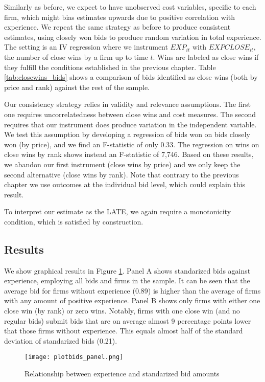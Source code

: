 Similarly as before, we expect to have unobserved cost variables, specific to each firm, which might bias estimates upwards due to positive correlation with experience. We repeat the same strategy as before to produce consistent estimates, using closely won bids to produce random variation in total experience. The setting is an IV regression where we instrument $EXP_{it}$ with $EXPCLOSE_{it}$, the number of close wins by a firm up to time $t$. Wins are labeled as close wins if they fulfill the conditions established in the  previous chapter. Table \ref{tab:closewins_bids} shows a comparison of bids identified as close wins (both by price and rank) against the rest of the sample.

Our consistency strategy relies in validity and relevance assumptions. The first one requires uncorrelatedness between close wins and cost measures. The second requires that our instrument does produce variation in the independent variable. We test this assumption by developing a regression of bids won on bids closely won (by price), and we find  an F-statistic of only 0.33. The regression on wins on close wins by rank shows instead an F-statistic of 7,746. Based on these results, we abandon our first instrument (close wins by price) and we only keep the second alternative (close wins by rank). Note that contrary to the previous chapter we use outcomes at the individual bid level, which could explain this result.

To interpret our estimate as the LATE, we again require a monotonicity condition, which is satisfied by construction.



\subsection{Results}
We show graphical results in Figure \ref{fig:plotbids_panel}. Panel A shows standarized bids against experience, employing all bids and firms in the sample. It can be seen that the average bid for firms without experience (0.89) is higher than the average of firms with any amount of positive experience. Panel B shows only firms with either one close win (by rank) or zero wins. Notably, firms with one close win (and no regular bids) submit bids that are on average almost 9 percentage points lower that those firms without experience. This equals almost half of the standard deviation of standarized bids (0.21).

\begin{figure}[H]
  \texttt{[image: plotbids\_panel.png]}
  \caption{Relationship between experience and standarized bid amounts}
  \label{fig:plotbids_panel}
\end{figure}

